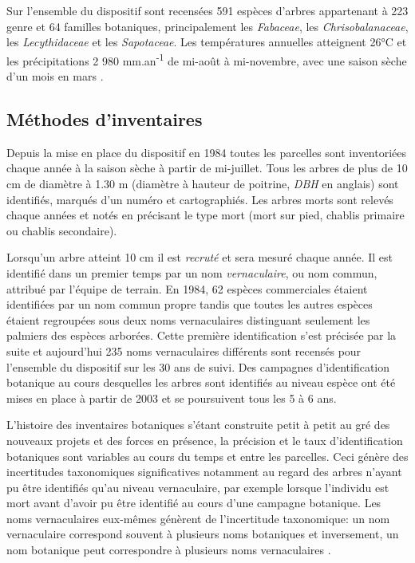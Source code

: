 \documentclass[
  11pt,
  french,
  A4paper,
  extrafontsizes,onecolumn,openright
  ]{memoir}
\begin{document}
Sur l'ensemble du dispositif sont recensées 591 espèces d'arbres
appartenant à 223 genre et 64 familles botaniques, principalement les
\emph{Fabaceae}, les \emph{Chrisobalanaceae}, les \emph{Lecythidaceae}
et les \emph{Sapotaceae}. Les températures annuelles atteignent 26°C et
les précipitations 2 980 mm.an\textsuperscript{-1} de mi-août à
mi-novembre, avec une saison sèche d'un mois en mars
\autocite{Wagner2011}.

\subsection{Méthodes d'inventaires}\label{methodes-dinventaires}

Depuis la mise en place du dispositif en 1984 toutes les parcelles sont
inventoriées chaque année à la saison sèche à partir de mi-juillet. Tous
les arbres de plus de 10 cm de diamètre à 1.30 m (diamètre à hauteur de
poitrine, \emph{DBH} en anglais) sont identifiés, marqués d'un numéro et
cartographiés. Les arbres morts sont relevés chaque années et notés en
précisant le type mort (mort sur pied, chablis primaire ou chablis
secondaire).

Lorsqu'un arbre atteint 10 cm il est \emph{recruté} et sera mesuré
chaque année. Il est identifié dans un premier temps par un nom
\emph{vernaculaire}, ou nom commun, attribué par l'équipe de terrain. En
1984, 62 espèces commerciales étaient identifiées par un nom commun
propre tandis que toutes les autres espèces étaient regroupées sous deux
noms vernaculaires distinguant seulement les palmiers des espèces
arborées. Cette première identification s'est précisée par la suite et
aujourd'hui 235 noms vernaculaires différents sont recensés pour
l'ensemble du dispositif sur les 30 ans de suivi. Des campagnes
d'identification botanique au cours desquelles les arbres sont
identifiés au niveau espèce ont été mises en place à partir de 2003 et
se poursuivent tous les 5 à 6 ans.

L'histoire des inventaires botaniques s'étant construite petit à petit
au gré des nouveaux projets et des forces en présence, la précision et
le taux d'identification botaniques sont variables au cours du temps et
entre les parcelles. Ceci génère des incertitudes taxonomiques
significatives notamment au regard des arbres n'ayant pu être identifiés
qu'au niveau vernaculaire, par exemple lorsque l'individu est mort avant
d'avoir pu être identifié au cours d'une campagne botanique. Les noms
vernaculaires eux-mêmes génèrent de l'incertitude taxonomique: un nom
vernaculaire correspond souvent à plusieurs noms botaniques et
inversement, un nom botanique peut correspondre à plusieurs noms
vernaculaires \autocite{Oldeman1968}.
\end{document}
